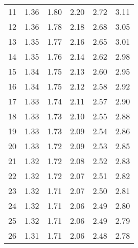 \begin{center}
\begin{tabular}{r | rrr rr}
\hline
\hline
11  &  {\normalsize  1.36} & {\normalsize  1.80} & {\normalsize  2.20} & {\normalsize  2.72} & {\normalsize  3.11}  \\ 
12  &  {\normalsize  1.36} & {\normalsize  1.78} & {\normalsize  2.18} & {\normalsize  2.68} & {\normalsize  3.05}  \\ 
13  &  {\normalsize  1.35} & {\normalsize  1.77} & {\normalsize  2.16} & {\normalsize  2.65} & {\normalsize  3.01}  \\ 
14  &  {\normalsize  1.35} & {\normalsize  1.76} & {\normalsize  2.14} & {\normalsize  2.62} & {\normalsize  2.98}  \\ 
15  &  {\normalsize  1.34} & {\normalsize  1.75} & {\normalsize  2.13} & {\normalsize  2.60} & {\normalsize  2.95}  \\ 
\hline
16  &  {\normalsize  1.34} & {\normalsize  1.75} & {\normalsize  2.12} & {\normalsize  2.58} & {\normalsize  2.92}  \\ 
17  &  {\normalsize  1.33} & {\normalsize  1.74} & {\normalsize  2.11} & {\normalsize  2.57} & {\normalsize  2.90}  \\ 
18  &  {\normalsize  1.33} & {\normalsize  1.73} & {\normalsize  2.10} & {\normalsize  2.55} & {\normalsize  2.88}  \\ 
19  &  {\normalsize  1.33} & {\normalsize  1.73} & {\normalsize  2.09} & {\normalsize  2.54} & {\normalsize  2.86}  \\ 
20  &  {\normalsize  1.33} & {\normalsize  1.72} & {\normalsize  2.09} & {\normalsize  2.53} & {\normalsize  2.85}  \\ 
\hline
\hline
21  &  {\normalsize  1.32} & {\normalsize  1.72} & {\normalsize  2.08} & {\normalsize  2.52} & {\normalsize  2.83}  \\ 
22  &  {\normalsize  1.32} & {\normalsize  1.72} & {\normalsize  2.07} & {\normalsize  2.51} & {\normalsize  2.82}  \\ 
23  &  {\normalsize  1.32} & {\normalsize  1.71} & {\normalsize  2.07} & {\normalsize  2.50} & {\normalsize  2.81}  \\ 
24  &  {\normalsize  1.32} & {\normalsize  1.71} & {\normalsize  2.06} & {\normalsize  2.49} & {\normalsize  2.80}  \\ 
25  &  {\normalsize  1.32} & {\normalsize  1.71} & {\normalsize  2.06} & {\normalsize  2.49} & {\normalsize  2.79}  \\ 
\hline
26  &  {\normalsize  1.31} & {\normalsize  1.71} & {\normalsize  2.06} & {\normalsize  2.48} & {\normalsize  2.78}  \\ 

\end{tabular}
\end{center}
